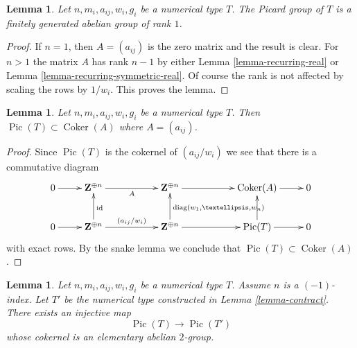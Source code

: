 \documentclass{stacks-project}
\theoremstyle{plain}
\newtheorem{lemma}[subsection]{Lemma}
\theoremstyle{definition}
\theoremstyle{remark}
\numberwithin{equation}{subsection}
\def\Coker{\mathop{\mathrm{Coker}}}
\def\Pic{\mathop{\mathrm{Pic}}\nolimits}
\begin{document}
\begin{lemma}
\label{lemma-picard-rank-1}
Let $n, m_i, a_{ij}, w_i, g_i$ be a numerical type $T$.
The Picard group of $T$ is a finitely generated abelian group of rank $1$.
\end{lemma}

\begin{proof}
If $n = 1$, then $A = (a_{ij})$ is the zero matrix and
the result is clear. For $n > 1$ the matrix $A$ has rank
$n - 1$ by either Lemma \ref{lemma-recurring-real} or
Lemma \ref{lemma-recurring-symmetric-real}.
Of course the rank is not affected by scaling the rows
by $1/w_i$. This proves the lemma.
\end{proof}

\begin{lemma}
\label{lemma-picard-T-and-A}
Let $n, m_i, a_{ij}, w_i, g_i$ be a numerical type $T$.
Then $\Pic(T) \subset \Coker(A)$ where $A = (a_{ij})$.
\end{lemma}

\begin{proof}
Since $\Pic(T)$ is the cokernel of $(a_{ij}/w_i)$
we see that there is a commutative diagram
$$
\xymatrix{
0 \ar[r] &
\mathbf{Z}^{\oplus n} \ar[rr]_A & &
\mathbf{Z}^{\oplus n} \ar[rr] & &
\Coker(A) \ar[r] & 0 \\
0 \ar[r] &
\mathbf{Z}^{\oplus n} \ar[rr]^{(a_{ij}/w_i)} \ar[u]_{\text{id}} & &
\mathbf{Z}^{\oplus n} \ar[rr] \ar[u]_{\text{diag}(w_1, \ldots, w_n)} & &
\Pic(T) \ar[r] \ar[u] & 0
}
$$
with exact rows. By the snake lemma we conclude that
$\Pic(T) \subset \Coker(A)$.
\end{proof}

\begin{lemma}
\label{lemma-contract-picard-group}
Let $n, m_i, a_{ij}, w_i, g_i$ be a numerical type $T$.
Assume $n$ is a $(-1)$-index. Let $T'$ be the numerical
type constructed in Lemma \ref{lemma-contract}. There exists an
injective map
$$
\Pic(T) \to \Pic(T')
$$
whose cokernel is an elementary abelian $2$-group.
\end{lemma}
\end{document}
